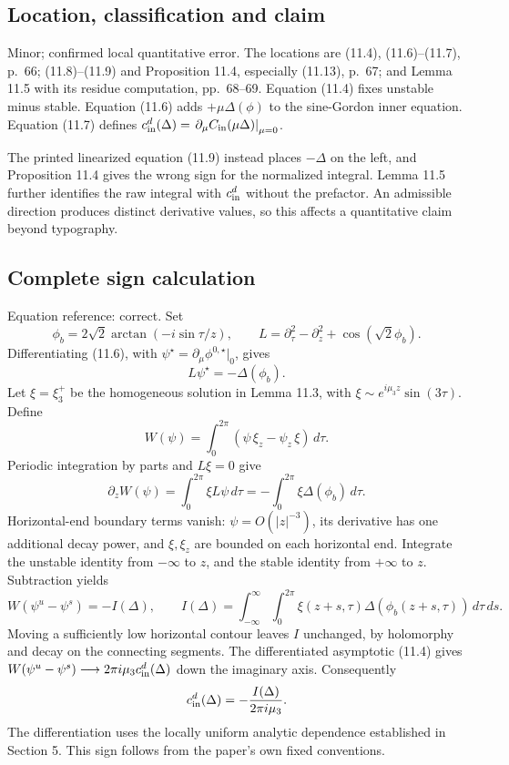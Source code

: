 \documentclass[10pt]{article}
\begin{document}
\subsection*{Location, classification and claim}
Minor; confirmed local quantitative error. The locations are (11.4), (11.6)–(11.7), p. 66; (11.8)–(11.9) and Proposition 11.4, especially (11.13), p. 67; and Lemma 11.5 with its residue computation, pp. 68–69. Equation (11.4) fixes unstable minus stable. Equation (11.6) adds \(+\mu\Delta(\phi)\) to the sine-Gordon inner equation. Equation (11.7) defines \(c_{\rm in}^{d}(\Delta)=\left.\partial_\mu C_{\rm in}(\mu\Delta)\right|_{\mu=0}\).\par
The printed linearized equation (11.9) instead places \(-\Delta\) on the left, and Proposition 11.4 gives the wrong sign for the normalized integral. Lemma 11.5 further identifies the raw integral with \(c_{\rm in}^{d}\) without the prefactor. An admissible direction produces distinct derivative values, so this affects a quantitative claim beyond typography.\par
\subsection*{Complete sign calculation}
Equation reference: correct. Set \[\phi_b=2\sqrt2\arctan(-i\sin\tau/z),\qquad
L=\partial_\tau^2-\partial_z^2+\cos(\sqrt2\phi_b).\] Differentiating (11.6), with \(\psi^\star=\partial_\mu\phi^{0,\star}|_0\), gives \[L\psi^\star=-\Delta(\phi_b).\] Let \(\xi=\xi_3^+\) be the homogeneous solution in Lemma 11.3, with \(\xi\sim e^{i\mu_3z}\sin(3\tau)\). Define \[W(\psi)=\int_0^{2\pi}(\psi\,\xi_z-\psi_z\,\xi)\,d\tau .\] Periodic integration by parts and \(L\xi=0\) give \[\partial_zW(\psi)=\int_0^{2\pi}\xi L\psi\,d\tau
=-\int_0^{2\pi}\xi\Delta(\phi_b)\,d\tau .\] Horizontal-end boundary terms vanish: \(\psi=O(|z|^{-3})\), its derivative has one additional decay power, and \(\xi,\xi_z\) are bounded on each horizontal end. Integrate the unstable identity from \(-\infty\) to \(z\), and the stable identity from \(+\infty\) to \(z\). Subtraction yields \[W(\psi^u-\psi^s)=-I(\Delta),\qquad
I(\Delta)=\int_{-\infty}^{\infty}\int_0^{2\pi}
 \xi(z+s,\tau)\Delta(\phi_b(z+s,\tau))\,d\tau\,ds .\] Moving a sufficiently low horizontal contour leaves \(I\) unchanged, by holomorphy and decay on the connecting segments. The differentiated asymptotic (11.4) gives \(W(\psi^u-\psi^s)\longrightarrow2\pi i\mu_3c_{\rm in}^{d}(\Delta)\) down the imaginary axis. Consequently \[
c_{\rm in}^{d}(\Delta)=-\frac{I(\Delta)}{2\pi i\mu_3}.\] The differentiation uses the locally uniform analytic dependence established in Section 5. This sign follows from the paper’s own fixed conventions.\par
\end{document}
